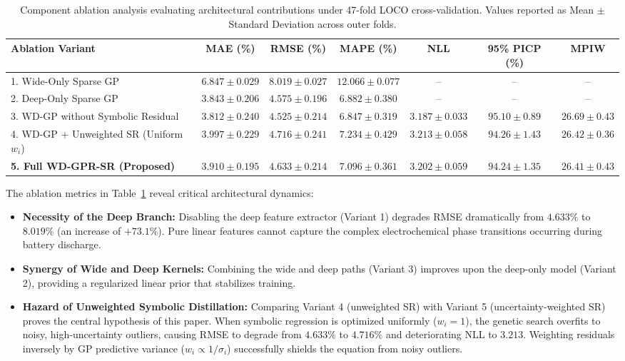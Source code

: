 \documentclass[a4paper,fleqn]{cas-sc}
\begin{document}
\begin{table}[t]
\centering
\caption{Component ablation analysis evaluating architectural contributions under 47-fold LOCO cross-validation. Values reported as Mean $\pm$ Standard Deviation across outer folds.}
\label{tab:ablation_summary}
\footnotesize
\renewcommand{\arraystretch}{1.2}
\begin{tabular*}{\textwidth}{@{\extracolsep{\fill}}lcccccc@{}}
\toprule
\textbf{Ablation Variant} & \textbf{MAE (\%)} & \textbf{RMSE (\%)} & \textbf{MAPE (\%)} & \textbf{NLL} & \textbf{95\% PICP (\%)} & \textbf{MPIW} \\
\midrule
1. Wide-Only Sparse GP & $6.847 \pm 0.029$ & $8.019 \pm 0.027$ & $12.066 \pm 0.077$ & -- & -- & -- \\
2. Deep-Only Sparse GP & $3.843 \pm 0.206$ & $4.575 \pm 0.196$ & $6.882 \pm 0.380$ & -- & -- & -- \\
3. WD-GP without Symbolic Residual & $3.812 \pm 0.240$ & $4.525 \pm 0.214$ & $6.847 \pm 0.319$ & $3.187 \pm 0.033$ & $95.10 \pm 0.89$ & $26.69 \pm 0.43$ \\
4. WD-GP + Unweighted SR (Uniform $w_i$) & $3.997 \pm 0.229$ & $4.716 \pm 0.241$ & $7.234 \pm 0.429$ & $3.213 \pm 0.058$ & $94.26 \pm 1.43$ & $26.42 \pm 0.36$ \\
\textbf{5. Full WD-GPR-SR (Proposed)} & $\mathbf{3.910 \pm 0.195}$ & $\mathbf{4.633 \pm 0.214}$ & $\mathbf{7.096 \pm 0.361}$ & $\mathbf{3.202 \pm 0.059}$ & $\mathbf{94.24 \pm 1.35}$ & $\mathbf{26.41 \pm 0.43}$ \\
\bottomrule
\end{tabular*}
\end{table}

The ablation metrics in Table~\ref{tab:ablation_summary} reveal critical architectural dynamics:
\begin{itemize}
    \item \textbf{Necessity of the Deep Branch:} Disabling the deep feature extractor (Variant 1) degrades RMSE dramatically from $4.633\%$ to $8.019\%$ (an increase of $+73.1\%$). Pure linear features cannot capture the complex electrochemical phase transitions occurring during battery discharge.
    \item \textbf{Synergy of Wide and Deep Kernels:} Combining the wide and deep paths (Variant 3) improves upon the deep-only model (Variant 2), providing a regularized linear prior that stabilizes training.
    \item \textbf{Hazard of Unweighted Symbolic Distillation:} Comparing Variant 4 (unweighted SR) with Variant 5 (uncertainty-weighted SR) proves the central hypothesis of this paper. When symbolic regression is optimized uniformly ($w_i = 1$), the genetic search overfits to noisy, high-uncertainty outliers, causing RMSE to degrade from $4.633\%$ to $4.716\%$ and deteriorating NLL to $3.213$. Weighting residuals inversely by GP predictive variance ($w_i \propto 1/\sigma_i$) successfully shields the equation from noisy outliers.
\end{itemize}
\end{document}
